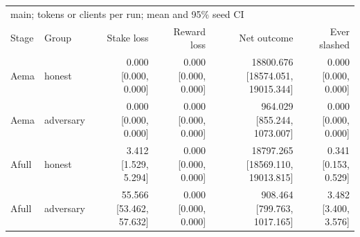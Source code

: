 \begin{tabular}{llrrrr}
\toprule
\multicolumn{6}{l}{main; tokens or clients per run; mean and 95\% seed CI} \\
Stage & Group & Stake loss & Reward loss & Net outcome & Ever slashed \\
\midrule
Aema & honest & \shortstack{0.000\\{}[0.000, 0.000]} & \shortstack{0.000\\{}[0.000, 0.000]} & \shortstack{18800.676\\{}[18574.051, 19015.344]} & \shortstack{0.000\\{}[0.000, 0.000]} \\
Aema & adversary & \shortstack{0.000\\{}[0.000, 0.000]} & \shortstack{0.000\\{}[0.000, 0.000]} & \shortstack{964.029\\{}[855.244, 1073.007]} & \shortstack{0.000\\{}[0.000, 0.000]} \\
Afull & honest & \shortstack{3.412\\{}[1.529, 5.294]} & \shortstack{0.000\\{}[0.000, 0.000]} & \shortstack{18797.265\\{}[18569.110, 19013.815]} & \shortstack{0.341\\{}[0.153, 0.529]} \\
Afull & adversary & \shortstack{55.566\\{}[53.462, 57.632]} & \shortstack{0.000\\{}[0.000, 0.000]} & \shortstack{908.464\\{}[799.763, 1017.165]} & \shortstack{3.482\\{}[3.400, 3.576]} \\
\bottomrule
\end{tabular}
